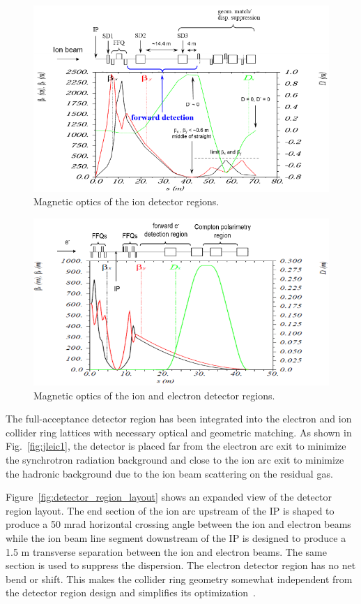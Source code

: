 \begin{figure}[!htb]
	\centering
	\includegraphics[width=.75\textwidth]{../../img/ion_magnet_optics}
	\caption{Magnetic optics of the ion detector regions.}
	\label{fig:ion_magnet_optics}
\end{figure}

\begin{figure}[!htb]
	\centering	
	\includegraphics[width=.75\textwidth]{../../img/electron_magnet_optics}	
	\caption{Magnetic optics of the ion and electron detector regions.}
	\label{fig:ele_magnet_optics}
	\end{figure}



The full-acceptance detector region has been integrated into the electron and ion collider ring lattices with necessary optical and geometric matching. As shown in Fig.~\ref{fig:jleic1}, the detector is placed far from the electron arc exit to minimize the synchrotron radiation background and close to the ion arc exit to minimize the hadronic background due to the ion beam scattering on the residual gas.

Figure~\ref{fig:detector_region_layout} shows an expanded view of the detector region layout. The end section of the ion arc upstream of the IP is shaped to produce a 50 mrad horizontal crossing angle between the ion and electron beams while the ion beam line segment downstream of the IP is designed to produce a 1.5 m transverse separation between the ion and electron beams. The same section is used to suppress the dispersion. The electron detector region has no net bend or shift. This makes the collider ring geometry somewhat independent from the detector region design and simplifies its optimization~\cite{Lin:2013}.

